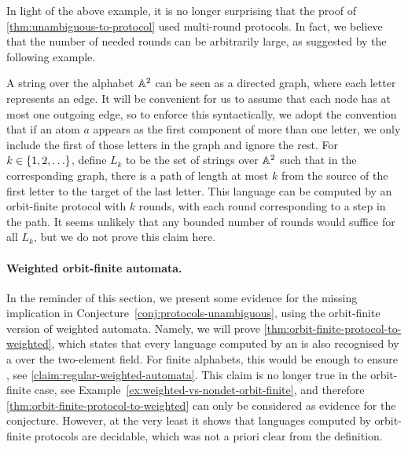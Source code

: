 In light of the above example, it is no longer surprising that the proof of
\cref{thm:unambiguous-to-protocol} used multi-round protocols. In fact, we
believe that the number of needed rounds can be arbitrarily large, as suggested
by the following example. 

\begin{myexample}
    A string over the alphabet $\mathbb A^2$ can be seen as a directed graph, where each letter represents an edge. It will be convenient for us to assume that each node has at most one outgoing edge, so to enforce this syntactically, we adopt the convention that
    if an atom $a$ appears
    as the first component of more than one letter, we only include the first
    of those letters in the graph and ignore the rest. For $k \in \{1,2,\ldots\}$, define $L_k$ to be the set of strings over $\mathbb A^2$ such that in the corresponding graph, there is a path of length at most $k$ from the source of the first letter to the target of the last letter. This language can be computed by an orbit-finite protocol with $k$ rounds, with each round corresponding to a step in the path. It seems unlikely that any bounded number of rounds would suffice for all $L_k$, but we do not prove this claim here.
\end{myexample}


\paragraph*{Weighted orbit-finite automata.} In the reminder of this section,
we present some evidence for the missing implication in
Conjecture~\ref{conj:protocols-unambiguous}, using the orbit-finite version of
weighted automata. Namely, we will prove
\cref{thm:orbit-finite-protocol-to-weighted}, which states that every language
computed by an  is also recognised by a  over the two-element field. For finite alphabets, this
would be enough to ensure , see
\cref{claim:regular-weighted-automata}. This claim is no longer true in the
orbit-finite case, see Example~\ref{ex:weighted-vs-nondet-orbit-finite}, and
therefore \cref{thm:orbit-finite-protocol-to-weighted} can only be considered
as evidence for the conjecture. However, at the very least it shows that
languages computed by orbit-finite protocols are decidable, which was not a
priori clear from the definition.

